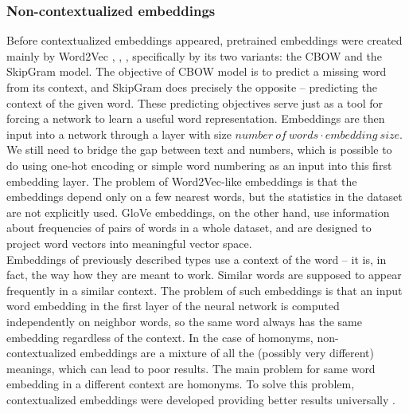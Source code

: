 \subsubsection{Non-contextualized embeddings}
Before contextualized embeddings appeared, pretrained embeddings were created mainly by Word2Vec \citep{Mikolov2013}, \citep{Turian2010}, \citep{Pennington}, specifically by its two variants: the CBOW and the SkipGram model.
The objective of CBOW model is to predict a missing word from its context, and SkipGram does precisely the opposite -- predicting the context of the given word. These predicting objectives serve just as a tool for forcing a network to learn a useful word representation. Embeddings are then input into a network through a layer with size $number\ of\ words \cdot embedding\ size$. We still need to bridge the gap between text and numbers, which is possible to do using one-hot encoding or simple word numbering as an input into this first embedding layer.  The problem of Word2Vec-like embeddings is that the embeddings depend only on a few nearest words, but the statistics in the dataset are not explicitly used. GloVe \citep{Pennington} embeddings, on the other hand, use information about frequencies of pairs of words in a whole dataset, and are designed to project word vectors into meaningful vector space. 
\\
Embeddings of previously described types use a  context of the word -- it is, in fact, the way how they are meant to work. Similar words are supposed to appear frequently in a similar context. The problem of such embeddings is that an input word embedding in the first layer of the neural network is computed independently on neighbor words, so the same word always has the same embedding regardless of the context. In the case of homonyms, non-contextualized embeddings are a mixture of all the (possibly very different) meanings, which can lead to poor results. %
The main problem for same word embedding in a different context are homonyms. To solve this problem, contextualized embeddings were developed providing better results universally \citep{Straka2019a, Liu2020}.

